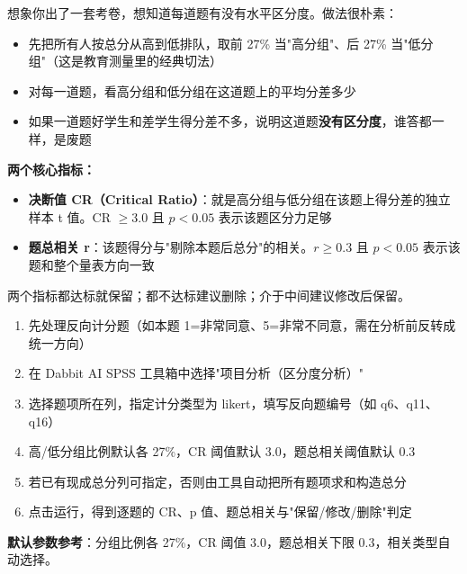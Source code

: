 \begin{algoprinciple}
想象你出了一套考卷，想知道每道题有没有水平区分度。做法很朴素：

\begin{itemize}
    \item 先把所有人按总分从高到低排队，取前 27\% 当"高分组"、后 27\% 当"低分组"（这是教育测量里的经典切法）
    \item 对每一道题，看高分组和低分组在这道题上的平均分差多少
    \item 如果一道题好学生和差学生得分差不多，说明这道题\textbf{没有区分度}，谁答都一样，是废题
\end{itemize}

\textbf{两个核心指标：}
\begin{itemize}
    \item \textbf{决断值 CR（Critical Ratio）}：就是高分组与低分组在该题上得分差的独立样本 t 值。CR $\geq 3.0$ 且 $p<0.05$ 表示该题区分力足够
    \item \textbf{题总相关 r}：该题得分与"剔除本题后总分"的相关。$r \geq 0.3$ 且 $p<0.05$ 表示该题和整个量表方向一致
\end{itemize}

两个指标都达标就保留；都不达标建议删除；介于中间建议修改后保留。
\end{algoprinciple}

\begin{algosposs}
\begin{enumerate}
    \item 先处理反向计分题（如本题 1=非常同意、5=非常不同意，需在分析前反转成统一方向）
    \item 在 Dabbit AI SPSS 工具箱中选择"项目分析（区分度分析）"
    \item 选择题项所在列，指定计分类型为 likert，填写反向题编号（如 q6、q11、q16）
    \item 高/低分组比例默认各 27\%，CR 阈值默认 3.0，题总相关阈值默认 0.3
    \item 若已有现成总分列可指定，否则由工具自动把所有题项求和构造总分
    \item 点击运行，得到逐题的 CR、p 值、题总相关与"保留/修改/删除"判定
\end{enumerate}

\textbf{默认参数参考}：分组比例各 27\%，CR 阈值 3.0，题总相关下限 0.3，相关类型自动选择。
\end{algosposs}

